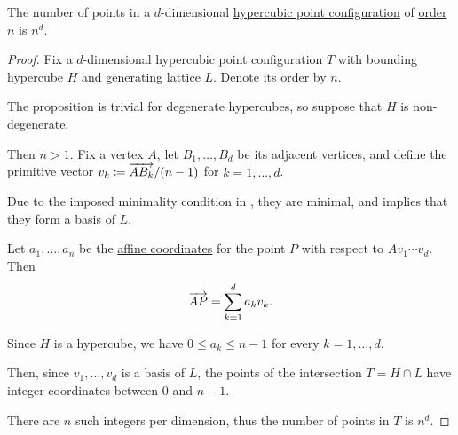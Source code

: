 \begin{proposition}\label{thm:hypercubic_point_configuration_cardinality}
  The number of points in a \( d \)-dimensional \hyperref[def:hypercubic_point_configuration]{hypercubic point configuration} of \hyperref[def:hypercubic_point_configuration_order]{order} \( n \) is \( n^d \).
\end{proposition}
\begin{proof}
  Fix a \( d \)-dimensional hypercubic point configuration \( T \) with bounding hypercube \( H \) and generating lattice \( L \). Denote its order by \( n \).

  The proposition is trivial for degenerate hypercubes, so suppose that \( H \) is non-degenerate.

  Then \( n > 1 \). Fix a vertex \( A \), let \( B_1, \ldots, B_d \) be its adjacent vertices, and define the primitive vector \( v_k \coloneqq \overrightarrow{A B_k} / (n - 1) \) for \( k = 1, \ldots, d \).

  Due to the imposed minimality condition in , they are minimal, and  implies that they form a basis of \( L \).

  Let \( a_1, \ldots, a_n \) be the \hyperref[def:affine_coordinate_system]{affine coordinates} for the point \( P \) with respect to \( A v_1 \cdots v_d \). Then
  \begin{equation*}
    \overrightarrow{AP} = \sum_{k=1}^d a_k v_k.
  \end{equation*}

  Since \( H \) is a hypercube, we have \( 0 \leq a_k \leq n - 1 \) for every \( k = 1, \ldots, d \).

  Then, since \( v_1, \ldots, v_d \) is a basis of \( L \), the points of the intersection \( T = H \cap L \) have integer coordinates between \( 0 \) and \( n - 1 \).

  There are \( n \) such integers per dimension, thus the number of points in \( T \) is \( n^d \).
\end{proof}

